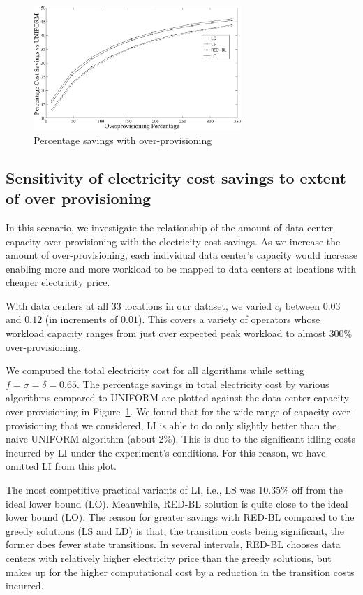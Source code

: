 \begin{figure}
\centering
\includegraphics[width=0.7\textwidth]{pics/s1vseqr.eps}
    \caption{Percentage savings with over-provisioning}
    \label{fig:s1r}
\end{figure}

\subsection{Sensitivity of electricity cost savings to extent of over provisioning}In this scenario, we investigate the relationship of the amount of data center capacity over-provisioning with the electricity cost savings. As we increase the amount of over-provisioning, each individual data center's capacity would increase enabling more and more workload to be mapped to data centers at locations with cheaper electricity price.

With data centers at all
    $33$ locations in our dataset, we varied $c_i$ between $0.03$ and
    $0.12$ (in increments of $0.01$). This covers a variety of operators whose workload capacity ranges from just over expected peak workload to
almost $300\%$ over-provisioning.

We computed the total electricity cost for all algorithms while setting $f=\sigma=\delta=0.65$. The percentage savings in total electricity cost by various algorithms compared to UNIFORM are plotted against the data center capacity over-provisioning in Figure~\ref{fig:s1r}. We found that for the wide range of capacity over-provisioning that we considered, LI is able to do only slightly better than the naive UNIFORM algorithm (about 2\%). This is due to the significant idling costs incurred by LI under the experiment's conditions. For this reason, we have omitted LI from this plot.

The most competitive practical variants of LI, i.e., LS was 10.35\% off from the ideal lower bound (LO). Meanwhile, RED-BL solution is quite close to the ideal lower bound (LO). The reason for greater savings with RED-BL compared to the greedy solutions (LS and LD) is that, the transition costs being significant, the former does fewer state transitions. In several intervals, RED-BL chooses data centers with relatively higher electricity price than the greedy solutions, but makes up for the higher computational cost by a reduction in the transition costs incurred.

